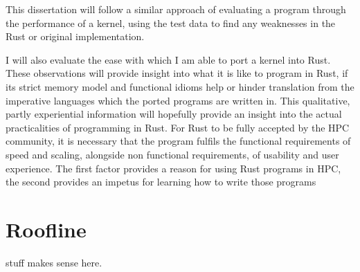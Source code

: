 This dissertation will follow a similar approach of evaluating a program through the performance of a kernel, using the test data to find any weaknesses in the Rust or original implementation.

I will also evaluate the ease with which I am able to port a kernel into Rust. These observations will provide insight into what it is like to program in Rust, if its strict memory model and functional idioms help or hinder translation from the imperative languages which the ported programs are written in. This qualitative, partly experiential information will hopefully provide an insight into the actual practicalities of programming in Rust. For Rust to be fully accepted by the HPC community, it is necessary that the program fulfils the functional requirements of speed and scaling, alongside non functional requirements, of usability and user experience. The first factor provides a reason for using Rust programs in HPC, the second provides an impetus for learning how to write those programs


\section{Roofline} stuff makes sense here.
